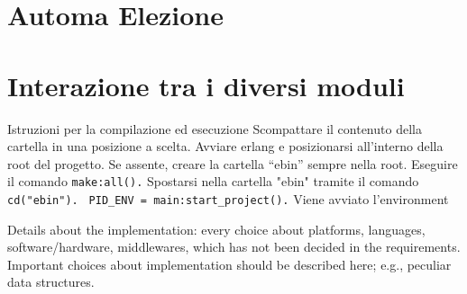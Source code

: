 \section{Automa Elezione}

\section{Interazione tra i diversi moduli}


Istruzioni per la compilazione ed esecuzione
Scompattare il contenuto della cartella in una posizione a scelta. 
Avviare erlang e posizionarsi all'interno della root del progetto. 
Se assente, creare la cartella ``ebin'' sempre nella root.
Eseguire il comando
\lstinline|make:all().|
Spostarsi nella cartella "ebin" tramite il comando
\lstinline|cd("ebin").|
\lstinline| PID_ENV = main:start_project().|
Viene avviato l'environment 



Details about the implementation: every choice about platforms, languages, software/hardware, middlewares, which has not been decided in the requirements.
Important choices about implementation should be described here; e.g., peculiar data structures.